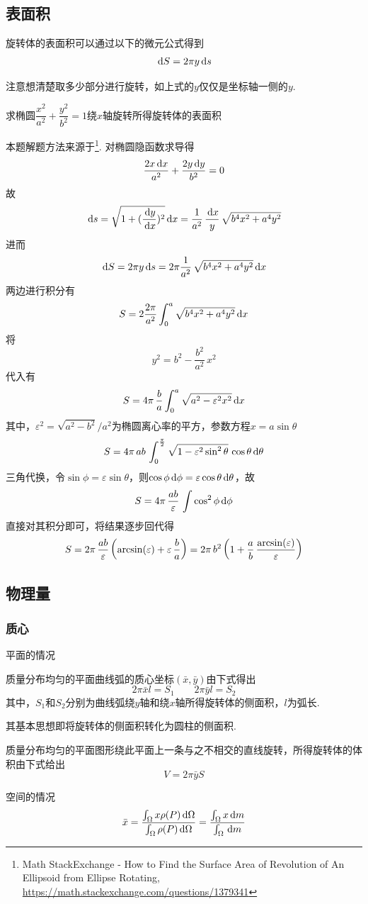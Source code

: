 \subsection{表面积}
旋转体的表面积可以通过以下的微元公式得到
\[\,\mathrm{d} S=2\pi y\,\mathrm{d} s\]
\par 注意想清楚取多少部分进行旋转，如上式的$y$仅仅是坐标轴一侧的$y$.
\begin{example}
求椭圆$\dfrac{x^2}{a^2}+\dfrac{y^2}{b^2}=1$绕$x$轴旋转所得旋转体的表面积
\end{example}
\begin{analysis}
本题解题方法来源于\footnote{Math StackExchange - How to Find the Surface Area of Revolution of An Ellipsoid from Ellipse Rotating, \url{https://math.stackexchange.com/questions/1379341}}.
对椭圆隐函数求导得
\[\frac{2x\,\mathrm{d} x}{a^2} + \frac{2y\,\mathrm{d} y}{b^2} = 0\]
故
\[\,\mathrm{d} s = \sqrt{1 + (\frac{\,\mathrm{d} y}{\,\mathrm{d} x})^2}\,\mathrm{d} x = \frac{1}{a^2}\,\frac{\,\mathrm{d} x}{y}\,\sqrt{b^4x^2 + a^4y^2}\]
进而
\[\,\mathrm{d} S = 2\pi y\,\mathrm{d} s=2\pi \frac{1}{a^2}\,\sqrt{b^4x^2 + a^4y^2}\,\mathrm{d} x\]
两边进行积分有
\[S = 2\frac{2\pi}{a^2}\int_{0}^{a} \sqrt{b^4x^2 + a^4y^2}\,\mathrm{d} x\]
将
\[y^2 = b^2 - \frac{b^2}{a^2}\,x^2\]
代入有
\[S = 4\pi\,\frac{b}{a}\int_{0}^{a} \sqrt{a^2 - \varepsilon^2x^2}\,\mathrm{d} x\]
其中，$\varepsilon^2=\sqrt{a^2-b^2}\Big/a^2$为椭圆离心率的平方，参数方程$x=a\sin\theta$
\[S = 4\pi\,ab\,\int_{0}^{\frac{\pi}{2}} \sqrt{1 - \varepsilon^2\sin^2\theta}\,\cos\theta\,\mathrm{d}\theta\]
三角代换，令$\sin\phi = \varepsilon\sin\theta$，则$\cos\phi\,\mathrm{d}\phi = \varepsilon\cos\theta\,\mathrm{d}\theta$，故
\[S = 4\pi\,\frac{ab}{\varepsilon}\,\int\cos^2\phi\,\mathrm{d}\phi\]
直接对其积分即可，将结果逐步回代得
\[S = 
2\pi\,\frac{ab}{\varepsilon}\left(\arcsin(\varepsilon) + \varepsilon\,\frac{b}{a}\right)= 
2\pi\,b^2\left(1 + \frac{a}{b}\,\frac{\arcsin(\varepsilon)}{\varepsilon}\right)\]
\end{analysis}

\subsection{物理量}
\subsubsection{质心}
平面的情况
\begin{theorem}
质量分布均匀的平面曲线弧的质心坐标$(\bar{x},\bar{y})$由下式得出
\[2\pi\bar{x}l=S_1\qquad 2\pi\bar{y}l=S_2\]
其中，$S_1$和$S_2$分别为曲线弧绕$y$轴和绕$x$轴所得旋转体的侧面积，$l$为弧长.
\end{theorem}
其基本思想即将旋转体的侧面积转化为圆柱的侧面积.
\begin{theorem}[古鲁金第二定理]
质量分布均匀的平面图形绕此平面上一条与之不相交的直线旋转，所得旋转体的体积由下式给出
\[V=2\pi\bar{y}S\]
\end{theorem}
空间的情况
\[\bar{x}=\frac{\int_\Omega x\rho(P)\,\mathrm{d}\Omega}{\int_\Omega\rho(P)\,\mathrm{d}\Omega}=\frac{\int_\Omega x\,\mathrm{d} m}{\int_\Omega\,\mathrm{d} m}\]

